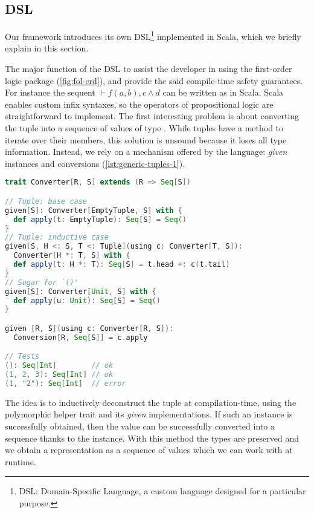 \subsection{DSL}

Our framework introduces its own DSL\footnote{DSL: Domain-Specific Language, a custom language designed for a particular purpose.} implemented in Scala, which we briefly explain in this section.



The major function of the DSL to assist the developer in using the first-order logic package (\autoref{fig:fol-erd}), and provide the said compile-time safety guarantees. For instance the sequent $\vdash f(a, b), c \land d$ can be written as  in Scala. Scala enables custom infix syntaxes, so the operators of propositional logic are straightforward to implement. The first interesting problem is about converting the tuple  into a sequence of values of type . While tuples have a method to iterate over their members, this solution is unsound because it loses all type information. Instead, we rely on a mechanism offered by the language: \textit{given} instances and conversions (\autoref{lst:generic-tuples-1}).

\begin{lstlisting}[language=Scala,caption={[Generic tuples (1)]{Generic tuples: converting a tuple of \code{T} into a \code{Seq[T]}.}},label={lst:generic-tuples-1}]
trait Converter[R, S] extends (R => Seq[S])

// Tuple: base case
given[S]: Converter[EmptyTuple, S] with {
  def apply(t: EmptyTuple): Seq[S] = Seq()
}
// Tuple: inductive case
given[S, H <: S, T <: Tuple](using c: Converter[T, S]):
  Converter[H *: T, S] with {
  def apply(t: H *: T): Seq[S] = t.head +: c(t.tail)
}
// Sugar for `()'
given[S]: Converter[Unit, S] with {
  def apply(u: Unit): Seq[S] = Seq()
}

given [R, S](using c: Converter[R, S]):
  Conversion[R, Seq[S]] = c.apply

// Tests
(): Seq[Int]        // ok
(1, 2, 3): Seq[Int] // ok
(1, "2"): Seq[Int]  // error
\end{lstlisting}

The idea is to inductively deconstruct the tuple at compilation-time, using the polymorphic helper trait  and its \textit{given} implementations. If such an instance is successfully obtained, then the value can be successfully converted into a sequence thanks to the  instance. With this method the types are preserved and we obtain a representation as a sequence of values which we can work with at runtime.

